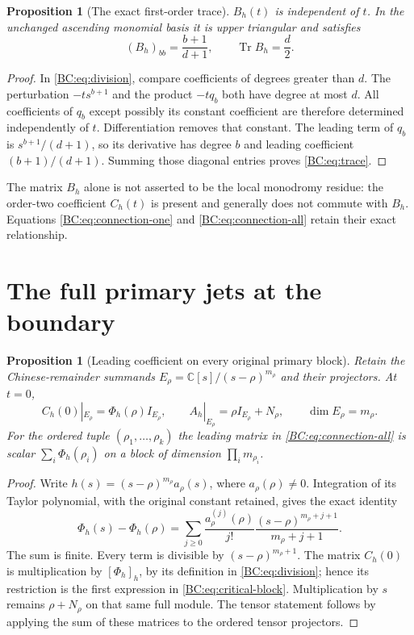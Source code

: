 \documentclass[11pt,a4paper]{article}
\newtheorem{proposition}[theorem]{Proposition}
\DeclareMathOperator{\Tr}{Tr}
\newcommand{\C}{\mathbb C}
\begin{document}
\begin{proposition}[The exact first-order trace]
$B_h(t)$ is independent of $t$.  In the unchanged ascending monomial
basis it is upper triangular and satisfies
\begin{equation}
 (B_h)_{bb}=\frac{b+1}{d+1},\qquad
 \boxed{\Tr B_h=\frac d2.}
 \label{BC:eq:trace}
\end{equation}
\end{proposition}
\begin{proof}
In \eqref{BC:eq:division}, compare coefficients of degrees greater than
$d$.  The perturbation $-ts^{b+1}$ and the product $-tq_b$ both have
degree at most $d$.  All coefficients of $q_b$ except possibly its
constant coefficient are therefore determined independently of $t$.
Differentiation removes that constant.  The leading term of $q_b$ is
$s^{b+1}/(d+1)$, so its derivative has degree $b$ and leading coefficient
$(b+1)/(d+1)$.  Summing those diagonal entries proves
\eqref{BC:eq:trace}.
\end{proof}

The matrix $B_h$ alone is not asserted to be the local monodromy
residue: the order-two coefficient $C_h(t)$ is present and generally
does not commute with $B_h$.  Equations \eqref{BC:eq:connection-one} and
\eqref{BC:eq:connection-all} retain their exact relationship.

\section{The full primary jets at the boundary}

\begin{proposition}[Leading coefficient on every original primary block]
Retain the Chinese-remainder summands
$E_\rho=\C[s]/(s-\rho)^{m_\rho}$ and their projectors.  At $t=0$,
\begin{equation}
 C_h(0)|_{E_\rho}=\Phi_h(\rho)I_{E_\rho},\qquad
 A_h|_{E_\rho}=\rho I_{E_\rho}+N_\rho,\qquad
 \dim E_\rho=m_\rho.
 \label{BC:eq:critical-block}
\end{equation}
For the ordered tuple $(\rho_1,\ldots,\rho_k)$ the leading matrix in
\eqref{BC:eq:connection-all} is scalar
$\sum_i\Phi_h(\rho_i)$ on a block of dimension
$\prod_i m_{\rho_i}$.
\end{proposition}
\begin{proof}
Write $h(s)=(s-\rho)^{m_\rho}a_\rho(s)$, where
$a_\rho(\rho)\ne0$.  Integration of its Taylor polynomial, with the
original constant retained, gives the exact identity
\begin{equation}
 \Phi_h(s)-\Phi_h(\rho)=
 \sum_{j\ge0}\frac{a_\rho^{(j)}(\rho)}{j!}
       \frac{(s-\rho)^{m_\rho+j+1}}{m_\rho+j+1}.
 \label{BC:eq:full-taylor}
\end{equation}
The sum is finite.  Every term is divisible by
$(s-\rho)^{m_\rho+1}$.  The matrix $C_h(0)$ is multiplication by
$[\Phi_h]_h$, by its definition in \eqref{BC:eq:division}; hence its
restriction is the first expression in \eqref{BC:eq:critical-block}.
Multiplication by $s$ remains $\rho+N_\rho$ on that same full module.
The tensor statement follows by applying the sum of these matrices
to the ordered tensor projectors.
\end{proof}
\end{document}
